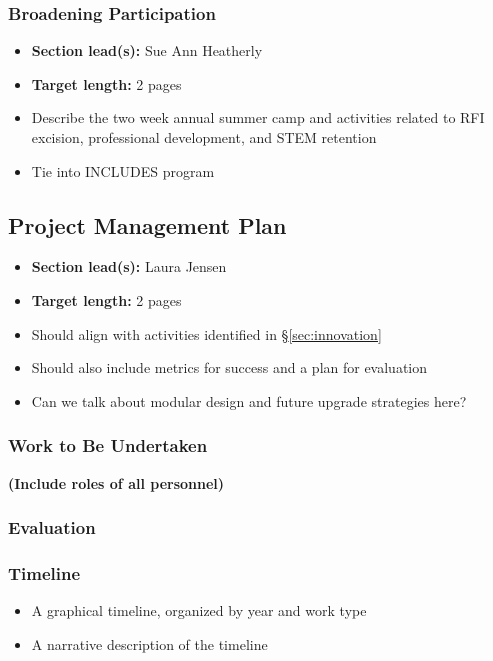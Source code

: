 \documentclass[10pt]{myNSF}
\begin{document}
\subsubsection{Broadening Participation}
\label{sec:participation}

\begin{itemize}
\item{\textbf{Section lead(s):} Sue Ann Heatherly}
\item{\textbf{Target length:} 2 pages}
\item{Describe the two week annual summer camp and activities related
  to RFI excision, professional development, and STEM retention}
\item{Tie into INCLUDES program}
\end{itemize}

\subsection{Project Management Plan}
\label{sec:plan}

\begin{itemize}
\item{\textbf{Section lead(s):} Laura Jensen}
\item{\textbf{Target length:} 2 pages}
\item{Should align with activities identified in
    \S\ref{sec:innovation}}
\item{Should also include metrics for success and a plan for evaluation}
\item{Can we talk about modular design and future upgrade strategies
  here?}
\end{itemize}

\subsubsection{Work to Be Undertaken}
\label{sec:milestones}

\textbf{(Include roles of all personnel)}

\subsubsection{Evaluation}
\label{sec:evaluation}

\subsubsection{Timeline}
\label{sec:timeline}

\begin{itemize}
\item{A graphical timeline, organized by year and work type}
\item{A narrative description of the timeline}
\end{itemize}
\end{document}
